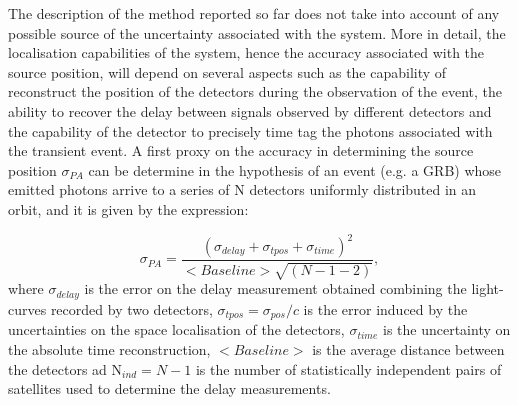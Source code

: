 \documentclass[]{spie}  %
\def \her{\textit{HERMES}\xspace}
\begin{document}
The description of the method reported so far does not take into account of any possible source of the uncertainty associated with the system. More in detail, the localisation capabilities of the system, hence the accuracy associated with the source position, will depend on several aspects such as the capability of reconstruct the position of the detectors during the observation of the event, the ability to recover the delay between signals observed by different detectors and the capability of the detector to precisely time tag the photons associated with the transient event. 
A first proxy on the accuracy in determining the source position $\sigma_{PA}$ can be determine in the hypothesis of an event (e.g. a GRB) whose emitted photons arrive to a series of N detectors uniformly distributed in an orbit, and it is given by the expression:

\begin{equation}
\label{eq:sigma_pos}
\sigma_{PA} = \dfrac{(\sigma_{delay}+\sigma_{tpos}+\sigma_{time})^2}{<Baseline>\sqrt{(N-1-2)}},
\end{equation}
%
where $\sigma_{delay}$ is the error on the delay measurement obtained combining the light-curves recorded by two detectors, $\sigma_{tpos}=\sigma_{pos}/c$ is the error induced by the uncertainties on the space localisation of the detectors, $\sigma_{time}$ is the uncertainty on the absolute time reconstruction, $<Baseline>$ is the average distance between the detectors ad N$_{ind} = N-1$ is the number of statistically independent pairs of satellites used to determine the delay measurements.\\

	
\end{document}
